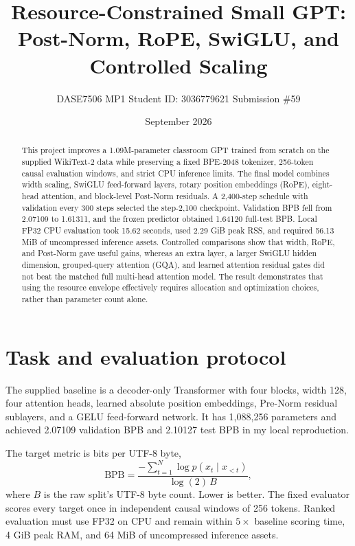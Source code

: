 \documentclass[10pt]{article}
\title{\vspace{-1.1cm}\textbf{Resource-Constrained Small GPT:\\Post-Norm, RoPE, SwiGLU, and Controlled Scaling}}
\author{DASE7506 MP1 \quad Student ID: 3036779621 \quad Submission \#59}
\date{September 2026}
\begin{document}
\maketitle
\vspace{-0.7cm}

\begin{abstract}
This project improves a 1.09M-parameter classroom GPT trained from scratch on the supplied WikiText-2 data while preserving a fixed BPE-2048 tokenizer, 256-token causal evaluation windows, and strict CPU inference limits. The final model combines width scaling, SwiGLU feed-forward layers, rotary position embeddings (RoPE), eight-head attention, and block-level Post-Norm residuals. A 2,400-step schedule with validation every 300 steps selected the step-2,100 checkpoint. Validation BPB fell from 2.07109 to 1.61311, and the frozen predictor obtained 1.64120 full-test BPB. Local FP32 CPU evaluation took 15.62 seconds, used 2.29 GiB peak RSS, and required 56.13 MiB of uncompressed inference assets. Controlled comparisons show that width, RoPE, and Post-Norm gave useful gains, whereas an extra layer, a larger SwiGLU hidden dimension, grouped-query attention (GQA), and learned attention residual gates did not beat the matched full multi-head attention model. The result demonstrates that using the resource envelope effectively requires allocation and optimization choices, rather than parameter count alone.
\end{abstract}

\section{Task and evaluation protocol}

The supplied baseline is a decoder-only Transformer with four blocks, width 128, four attention heads, learned absolute position embeddings, Pre-Norm residual sublayers, and a GELU feed-forward network. It has 1,088,256 parameters and achieved 2.07109 validation BPB and 2.10127 test BPB in my local reproduction.

The target metric is bits per UTF-8 byte,
\begin{equation}
\mathrm{BPB}=\frac{-\sum_{t=1}^{N}\log p(x_t\mid x_{<t})}{\log(2)\,B},
\end{equation}
where $B$ is the raw split's UTF-8 byte count. Lower is better. The fixed evaluator scores every target once in independent causal windows of 256 tokens. Ranked evaluation must use FP32 on CPU and remain within $5\times$ baseline scoring time, 4 GiB peak RAM, and 64 MiB of uncompressed inference assets.
\end{document}
